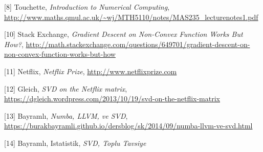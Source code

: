 \documentclass[12pt,fleqn]{article}\usepackage{../../common}
\begin{document}
[8] Touchette, {\em Introduction to Numerical Computing},
    \url{http://www.maths.qmul.ac.uk/~wj/MTH5110/notes/MAS235_lecturenotes1.pdf}

[10] Stack Exchange, {\em Gradient Descent on Non-Convex Function Works But How?},
     \url{http://math.stackexchange.com/questions/649701/gradient-descent-on-non-convex-function-works-but-how}

[11] Netflix, {\em Netflix Prize},
     \url{http://www.netflixprize.com}

[12] Gleich, {\em SVD on the Netflix matrix},
     \url{https://dgleich.wordpress.com/2013/10/19/svd-on-the-netflix-matrix}

[13] Bayramlı, {\em Numba, LLVM, ve SVD}, 
     \url{https://burakbayramli.github.io/dersblog/sk/2014/09/numba-llvm-ve-svd.html}

[14] Bayramlı, Istatistik, {\em SVD, Toplu Tavsiye}
\end{document}
